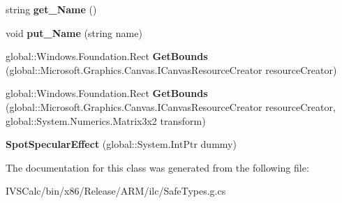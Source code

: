 \begin{DoxyCompactItemize}
\item 
\mbox{\label{class_microsoft_1_1_graphics_1_1_canvas_1_1_effects_1_1_spot_specular_effect_a4cee2d3b8d6c8d7c3806d7c618423b1b}} 
string {\bfseries get\+\_\+\+Name} ()
\item 
\mbox{\label{class_microsoft_1_1_graphics_1_1_canvas_1_1_effects_1_1_spot_specular_effect_acfbb75a4f9d89ea84e89f4b37ae058f6}} 
void {\bfseries put\+\_\+\+Name} (string name)
\item 
\mbox{\label{class_microsoft_1_1_graphics_1_1_canvas_1_1_effects_1_1_spot_specular_effect_af612f6134e91b1ed5295b3aa6fa0540f}} 
global\+::\+Windows.\+Foundation.\+Rect {\bfseries Get\+Bounds} (global\+::\+Microsoft.\+Graphics.\+Canvas.\+I\+Canvas\+Resource\+Creator resource\+Creator)
\item 
\mbox{\label{class_microsoft_1_1_graphics_1_1_canvas_1_1_effects_1_1_spot_specular_effect_a7c7e4f980041eb6d4241d77645cd359a}} 
global\+::\+Windows.\+Foundation.\+Rect {\bfseries Get\+Bounds} (global\+::\+Microsoft.\+Graphics.\+Canvas.\+I\+Canvas\+Resource\+Creator resource\+Creator, global\+::\+System.\+Numerics.\+Matrix3x2 transform)
\item 
\mbox{\label{class_microsoft_1_1_graphics_1_1_canvas_1_1_effects_1_1_spot_specular_effect_ad8ff784c45c090ff7b56ad390b96a1e8}} 
{\bfseries Spot\+Specular\+Effect} (global\+::\+System.\+Int\+Ptr dummy)
\end{DoxyCompactItemize}


The documentation for this class was generated from the following file\+:\begin{DoxyCompactItemize}
\item 
I\+V\+S\+Calc/bin/x86/\+Release/\+A\+R\+M/ilc/Safe\+Types.\+g.\+cs\end{DoxyCompactItemize}
